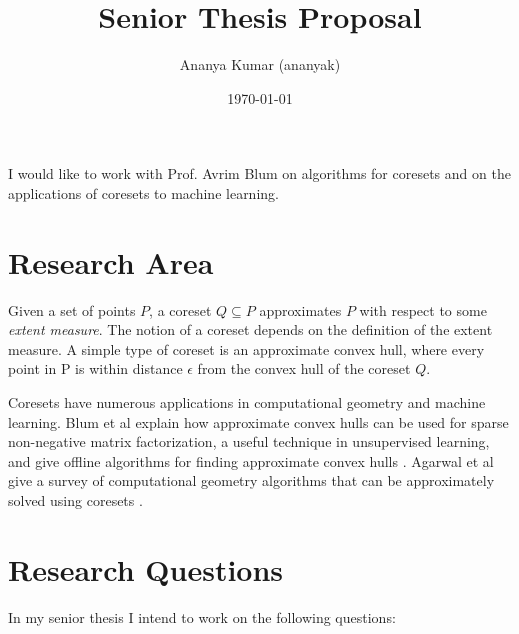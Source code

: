 \documentclass[12pt]{article}
\begin{document}
\title{Senior Thesis Proposal}         %
\author{Ananya Kumar (ananyak)}        %
\date{\today}          %
\maketitle

I would like to work with Prof. Avrim Blum on algorithms for coresets and on the applications of coresets to machine learning.

\section{Research Area}

Given a set of points $P$, a coreset $Q \subseteq P$ approximates $P$ with respect to some \emph{extent measure}. The notion of a coreset depends on the definition of the extent measure. A simple type of coreset is an approximate convex hull, where every point in P is within distance $\epsilon$ from the convex hull of the coreset $Q$.

Coresets have numerous applications in computational geometry and machine learning. Blum et al explain how approximate convex hulls can be used for sparse non-negative matrix factorization, a useful technique in unsupervised learning, and give offline algorithms for finding approximate convex hulls \cite{blum-peled}. Agarwal et al give a survey of computational geometry algorithms that can be approximately solved using coresets \cite{survey}.

\section{Research Questions}

In my senior thesis I intend to work on the following questions:
\end{document}
